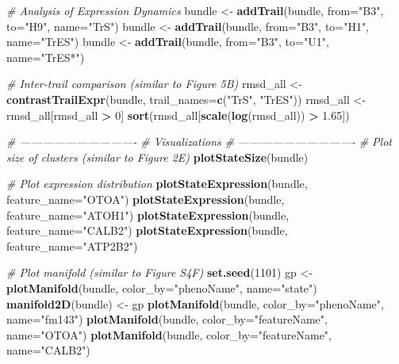\documentclass[]{book}
\newenvironment{Shaded}{\begin{snugshade}}{\end{snugshade}}
\newcommand{\KeywordTok}[1]{\textcolor[rgb]{0.13,0.29,0.53}{\textbf{#1}}}
\newcommand{\DataTypeTok}[1]{\textcolor[rgb]{0.13,0.29,0.53}{#1}}
\newcommand{\DecValTok}[1]{\textcolor[rgb]{0.00,0.00,0.81}{#1}}
\newcommand{\FloatTok}[1]{\textcolor[rgb]{0.00,0.00,0.81}{#1}}
\newcommand{\StringTok}[1]{\textcolor[rgb]{0.31,0.60,0.02}{#1}}
\newcommand{\CommentTok}[1]{\textcolor[rgb]{0.56,0.35,0.01}{\textit{#1}}}
\newcommand{\OperatorTok}[1]{\textcolor[rgb]{0.81,0.36,0.00}{\textbf{#1}}}
\newcommand{\NormalTok}[1]{#1}
\theoremstyle{definition}
\theoremstyle{definition}
\theoremstyle{definition}
\theoremstyle{remark}
\begin{document}
\begin{Shaded}
\begin{Highlighting}[]
\CommentTok{# Analysis of Expression Dynamics}
\NormalTok{bundle <-}\StringTok{ }\KeywordTok{addTrail}\NormalTok{(bundle, }\DataTypeTok{from=}\StringTok{"B3"}\NormalTok{, }\DataTypeTok{to=}\StringTok{"H9"}\NormalTok{, }\DataTypeTok{name=}\StringTok{"TrS"}\NormalTok{)}
\NormalTok{bundle <-}\StringTok{ }\KeywordTok{addTrail}\NormalTok{(bundle, }\DataTypeTok{from=}\StringTok{"B3"}\NormalTok{, }\DataTypeTok{to=}\StringTok{"H1"}\NormalTok{, }\DataTypeTok{name=}\StringTok{"TrES"}\NormalTok{)}
\NormalTok{bundle <-}\StringTok{ }\KeywordTok{addTrail}\NormalTok{(bundle, }\DataTypeTok{from=}\StringTok{"B3"}\NormalTok{, }\DataTypeTok{to=}\StringTok{"U1"}\NormalTok{, }\DataTypeTok{name=}\StringTok{"TrES*"}\NormalTok{)}

\CommentTok{# Inter-trail comparison (similar to Figure 5B)}
\NormalTok{rmsd_all <-}\StringTok{ }\KeywordTok{contrastTrailExpr}\NormalTok{(bundle, }\DataTypeTok{trail_names=}\KeywordTok{c}\NormalTok{(}\StringTok{"TrS"}\NormalTok{, }\StringTok{"TrES"}\NormalTok{))}
\NormalTok{rmsd_all <-}\StringTok{ }\NormalTok{rmsd_all[rmsd_all }\OperatorTok{>}\StringTok{ }\DecValTok{0}\NormalTok{]}
\KeywordTok{sort}\NormalTok{(rmsd_all[}\KeywordTok{scale}\NormalTok{(}\KeywordTok{log}\NormalTok{(rmsd_all)) }\OperatorTok{>}\StringTok{ }\FloatTok{1.65}\NormalTok{])}

\CommentTok{# -------------------------------}
\CommentTok{# Visualizations}
\CommentTok{# -------------------------------}
\CommentTok{# Plot size of clusters (similar to Figure 2E)}
\KeywordTok{plotStateSize}\NormalTok{(bundle)}

\CommentTok{# Plot expression distribution}
\KeywordTok{plotStateExpression}\NormalTok{(bundle, }\DataTypeTok{feature_name=}\StringTok{"OTOA"}\NormalTok{)}
\KeywordTok{plotStateExpression}\NormalTok{(bundle, }\DataTypeTok{feature_name=}\StringTok{"ATOH1"}\NormalTok{)}
\KeywordTok{plotStateExpression}\NormalTok{(bundle, }\DataTypeTok{feature_name=}\StringTok{"CALB2"}\NormalTok{)}
\KeywordTok{plotStateExpression}\NormalTok{(bundle, }\DataTypeTok{feature_name=}\StringTok{"ATP2B2"}\NormalTok{)}

\CommentTok{# Plot manifold (similar to Figure S4F)}
\KeywordTok{set.seed}\NormalTok{(}\DecValTok{1101}\NormalTok{)}
\NormalTok{gp <-}\StringTok{ }\KeywordTok{plotManifold}\NormalTok{(bundle, }\DataTypeTok{color_by=}\StringTok{"phenoName"}\NormalTok{, }\DataTypeTok{name=}\StringTok{"state"}\NormalTok{)}
\KeywordTok{manifold2D}\NormalTok{(bundle) <-}\StringTok{ }\NormalTok{gp}
\KeywordTok{plotManifold}\NormalTok{(bundle, }\DataTypeTok{color_by=}\StringTok{"phenoName"}\NormalTok{, }\DataTypeTok{name=}\StringTok{"fm143"}\NormalTok{)}
\KeywordTok{plotManifold}\NormalTok{(bundle, }\DataTypeTok{color_by=}\StringTok{"featureName"}\NormalTok{, }\DataTypeTok{name=}\StringTok{"OTOA"}\NormalTok{)}
\KeywordTok{plotManifold}\NormalTok{(bundle, }\DataTypeTok{color_by=}\StringTok{"featureName"}\NormalTok{, }\DataTypeTok{name=}\StringTok{"CALB2"}\NormalTok{)}


\end{Highlighting}
\end{Shaded}
\end{document}
